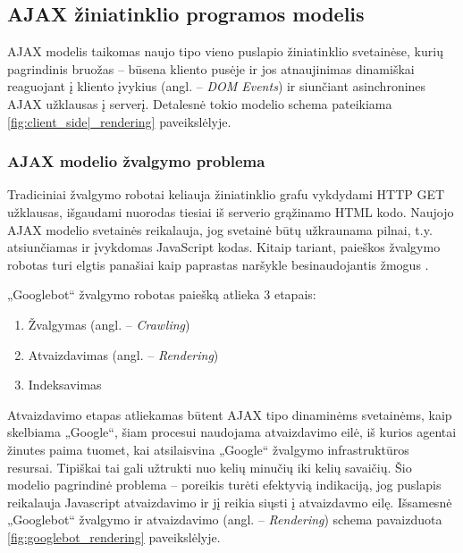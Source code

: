 \subsection{AJAX žiniatinklio programos modelis}

AJAX modelis taikomas naujo tipo vieno puslapio žiniatinklio svetainėse, kurių pagrindinis bruožas -- būsena kliento pusėje ir jos atnaujinimas dinamiškai reaguojant į kliento įvykius (angl. -- \textit{DOM Events}) ir siunčiant asinchronines AJAX užklausas į serverį. Detalesnė tokio modelio schema pateikiama \ref{fig:client_side|_rendering} paveikslėlyje.



\subsubsection{AJAX modelio žvalgymo problema}

Tradiciniai žvalgymo robotai keliauja žiniatinklio grafu vykdydami HTTP GET užklausas, išgaudami nuorodas tiesiai iš serverio grąžinamo HTML kodo. Naujojo AJAX modelio svetainės reikalauja, jog svetainė būtų užkraunama pilnai, t.y. atsiunčiamas ir įvykdomas JavaScript kodas. Kitaip tariant, paieškos žvalgymo robotas turi elgtis panašiai kaip paprastas naršykle besinaudojantis žmogus \cite{JavaScriptCrawl}.


„Googlebot“ žvalgymo robotas paiešką atlieka 3 etapais:

\begin{enumerate}
    \item Žvalgymas (angl. -- \textit{Crawling})
    \item Atvaizdavimas (angl. -- \textit{Rendering})
    \item Indeksavimas
\end{enumerate}

Atvaizdavimo etapas atliekamas būtent AJAX tipo dinaminėms svetainėms, kaip skelbiama „Google“, šiam procesui naudojama atvaizdavimo eilė, iš kurios agentai žinutes paima tuomet, kai atsilaisvina „Google“ žvalgymo infrastruktūros resursai. Tipiškai tai gali užtrukti nuo kelių minučių iki kelių savaičių. Šio modelio pagrindinė problema -- poreikis turėti efektyvią indikaciją, jog puslapis reikalauja Javascript atvaizdavimo ir jį reikia siųsti į atvaizdavmo eilę. Išsamesnė „Googlebot“ žvalgymo ir atvaizdavimo (angl. -- \textit{Rendering}) schema pavaizduota \ref{fig:googlebot_rendering} paveikslėlyje.

